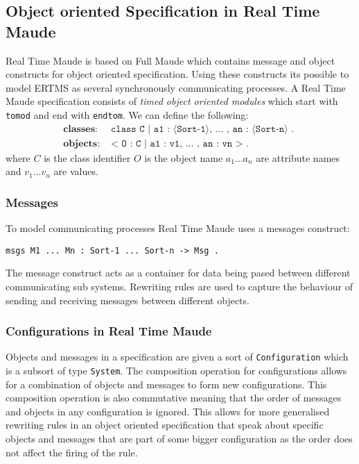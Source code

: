 \subsection{Object oriented Specification in Real Time Maude}
Real Time Maude is based on Full Maude which contains message and object constructs for object oriented specification. Using these constructs its possible to model ERTMS as several synchronously communicating processes. A Real Time Maude specification consists of  \emph{timed object oriented modules} which start with \texttt{tomod} and end with \texttt{endtom}.
\medskip
We can define the following:
\begin{align*}
\textbf{classes}: & \texttt{ class C | a1 : ⟨Sort-1⟩, ... , an : ⟨Sort-n⟩ . } \\
\textbf{objects}: & \texttt{ < O : C | a1 : v1, ... , an : vn >  . } 
\end{align*}
where $C$ is the class identifier $O$ is the object name  $a_1 \ldots a_n$ are attribute names and $v_1 \ldots v_n$ are values. \\
\medskip
\subsubsection*{Messages}
To model communicating processes Real Time Maude uses a messages construct:
\begin{center}
\verb|msgs M1 ... Mn : Sort-1 ... Sort-n -> Msg . | 
\end{center}

The message construct acts as a container for data being pased between different communicating sub systems. Rewriting rules are used to capture the behaviour of sending and receiving messages between different objects.

\subsubsection*{Configurations in Real Time Maude}
Objects and messages in a specification are given a sort of \texttt{Configuration} which is a subsort of type \texttt{System}. The composition operation for configurations allows for a combination of objects and messages to form new configurations. This composition operation is also commutative meaning that the order of messages and objects in any configuration is ignored. This allows for more generalised rewriting rules in an object oriented specification that speak about specific objects and messages that are part of some bigger configuration as the order does not affect the firing of the rule.

